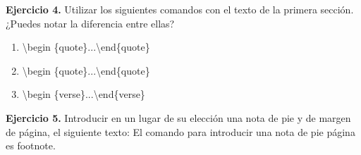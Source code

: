 \documentclass{article}
\begin{document}
\textbf{Ejercicio 4.} Utilizar los siguientes comandos con el texto de la primera sección. ¿Puedes notar la diferencia entre ellas?
\begin{enumerate}
    \item \textbackslash begin \{quote\}...\textbackslash end\{quote\}
    \item \textbackslash begin \{quote\}...\textbackslash end\{quote\}
    \item \textbackslash begin \{verse\}...\textbackslash end\{verse\}
\end{enumerate}

\textbf{Ejercicio 5.} Introducir en un lugar de su elección una nota de pie y de margen de página, el siguiente texto: El comando para introducir una nota de pie página es footnote.
\end{document}
